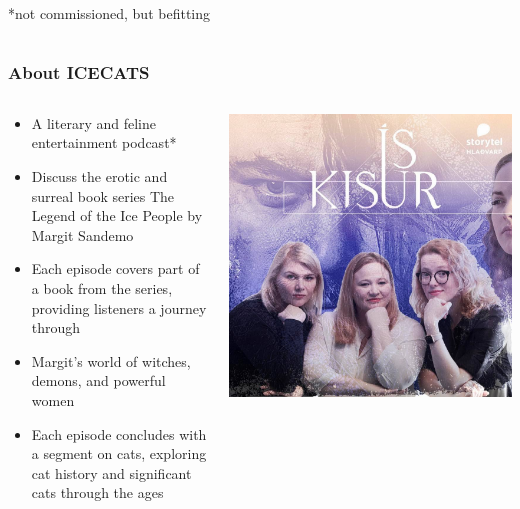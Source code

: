 \begin{frame}
\begin{columns}[T]
\begin{column}{0.4\textwidth}
            \vspace{24pt}

            \scriptsize{*not commissioned, but befitting}
        \end{column}
    \end{columns}
\end{frame}

\begin{frame}
    \frametitle{About ICECATS}
    \begin{columns}[T]
        \begin{column}{0.55\textwidth}
            \begin{itemize}
                \item A literary and feline entertainment podcast*
                \item Discuss the erotic and surreal book series The Legend of the Ice People by Margit Sandemo
                \item Each episode covers part of a book from the series, providing listeners a journey through
                \item Margit's
                world of witches, demons, and powerful women
                \item Each episode concludes with a segment on cats, exploring cat history and significant
                cats through the ages
            \end{itemize}
        \end{column}
        \begin{column}{0.45\textwidth}
            \centering
            \includegraphics[width=\textwidth]{figures/podcast_image.jpg}

\end{column}
\end{columns}
\end{frame}
